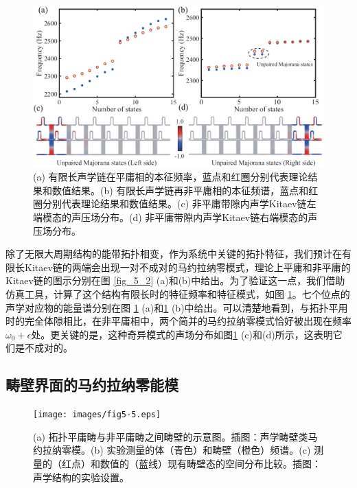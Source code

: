 \begin{figure}[h!]
    \centering
    \includegraphics[width=1\textwidth]{images/fig5-4.eps} 
    \caption{(a) 有限长声学链在平庸相的本征频率，蓝点和红圈分别代表理论结果和数值结果。(b) 有限长声学链再非平庸相的本征频谱，蓝点和红圈分别代表理论结果和数值结果。(c) 非平庸带隙内声学Kitaev链左端模态的声压场分布。(d) 非平庸带隙内声学Kitaev链右端模态的声压场分布。}
    \label{fig_5_4}
\end{figure}

除了无限大周期结构的能带拓扑相变，作为系统中关键的拓扑特征，我们预计在有限长Kitaev链的两端会出现一对不成对的马约拉纳零模式，理论上平庸和非平庸的Kitaev链的图示分别在图 \ref{fig_5_2} (a)和(b)中给出。为了验证这一点，我们借助仿真工具，计算了这个结构有限长时的特征频率和特征模式，如图 \ref{fig_5_4}。七个位点的声学对应物的能量谱分别在图 \ref{fig_5_4} (a)和\ref{fig_5_4} (b)中给出。可以清楚地看到，与拓扑平用时的完全体隙相比，在非平庸相中，两个简并的马约拉纳零模式恰好被出现在频率\(\omega_{0} + \epsilon\)处。更关键的是，这种奇异模式的声场分布如图\ref{fig_5_4} (c)和(d)所示，这表明它们是不成对的。


\subsection{畴壁界面的马约拉纳零能模}

\begin{figure}[h!]
    \centering
    \texttt{[image: images/fig5-5.eps]} 
    \caption{(a) 拓扑平庸畴与非平庸畴之间畴壁的示意图。插图：声学畴壁类马约拉纳零模。(b) 实验测量的体（青色）和畴壁（橙色）频谱。(c) 测量的（红点）和数值的（蓝线）现有畴壁态的空间分布比较。插图：声学结构的实验设置。}
    \label{fig_5_5}
\end{figure}

